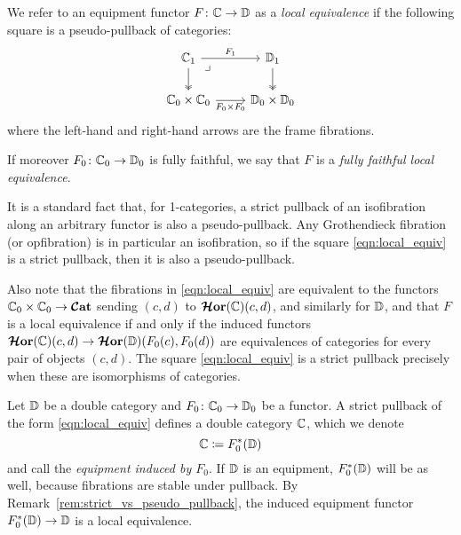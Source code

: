 \documentclass[11pt,oneside,article]{memoir}
\begin{document}
\begin{definition}
      \label{def:local_equivalence}
   We refer to an equipment functor $F\colon\mathbb{C}\to\mathbb{D}$ as a \emph{local equivalence} if
   the following square is a pseudo-pullback of categories:
   \begin{equation} \begin{tikzcd}
         \label{eqn:local_equiv}
      \dcat{C}_1 \ar[r,"F_1"] \ar[d,two heads] \ar[dr,phantom,"\lrcorner" very near start]
         & \dcat{D}_1 \ar[d,two heads] \\
      \dcat{C}_0\times\dcat{C}_0 \ar[r,"F_0\times F_0"']
         & \dcat{D}_0\times\dcat{D}_0
   \end{tikzcd} \end{equation}
   where the left-hand and right-hand arrows are the frame fibrations.

   If moreover $F_0\colon\mathbb{C}_0\to\mathbb{D}_0$ is fully faithful, we say that $F$ is a
   \emph{fully faithful local equivalence}.
\end{definition}

\begin{remark}
      \label{rem:strict_vs_pseudo_pullback}
   It is a standard fact that, for 1-categories, a strict pullback of an isofibration along an
   arbitrary functor is also a pseudo-pullback. Any Grothendieck fibration (or opfibration) is in
   particular an isofibration, so if the square \eqref{eqn:local_equiv} is a strict pullback, then
   it is also a pseudo-pullback.

   Also note that the fibrations in \eqref{eqn:local_equiv} are equivalent to the functors
   $\mathbb{C}_0\times\mathbb{C}_0\to\bm{\mathcal{C}}\mathbf{at}$ sending $(c,d)$ to $\bm{\mathcal{H}}\mathbf{or}(\mathbb{C})(c,d)$, and similarly for
   $\mathbb{D}$, and that $F$ is a local equivalence if and only if the induced functors
   $\bm{\mathcal{H}}\mathbf{or}(\mathbb{C})(c,d)\to\bm{\mathcal{H}}\mathbf{or}(\mathbb{D})(F_0(c),F_0(d))$ are equivalences of categories for every
   pair of objects $(c,d)$. The square \eqref{eqn:local_equiv} is a strict pullback precisely when
   these are isomorphisms of categories.
\end{remark}

\begin{definition}
      \label{def:induced_locally_equivalent_equipment}
   Let $\mathbb{D}$ be a double category and $F_0\colon\mathbb{C}_0\to\mathbb{D}_0$ be a functor. A strict
   pullback of the form \eqref{eqn:local_equiv} defines a double category $\mathbb{C}$, which we denote
   \[
      \mathbb{C}\coloneqq F_0^*(\mathbb{D})
   \]
   and call the \emph{equipment induced by $F_0$}. If $\mathbb{D}$ is an equipment, $F_0^*(\mathbb{D})$
   will be as well, because fibrations are stable under pullback. By
   Remark~\ref{rem:strict_vs_pseudo_pullback}, the induced equipment functor
   $F_0^*(\mathbb{D})\to\mathbb{D}$ is a local equivalence.
\end{definition}
\end{document}
